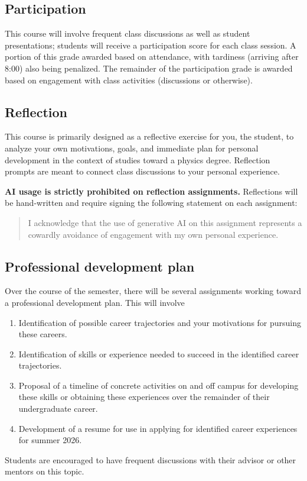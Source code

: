\documentclass{syllabus}
\begin{document}
\subsection*{Participation} This course will involve frequent class discussions as well as student presentations; students will receive a participation score for each class session. A portion of this grade awarded based on attendance, with tardiness (arriving after 8:00) also being penalized. The remainder of the participation grade is awarded based on engagement with class activities (discussions or otherwise).

\subsection{Reflection}
This course is primarily designed as a reflective exercise for you, the student, to analyze your own motivations, goals, and immediate plan for personal development in the context of studies toward a physics degree. Reflection prompts are meant to connect class discussions to your personal experience. 

\textbf{AI usage is strictly prohibited on reflection assignments.} Reflections will be hand-written and require signing the following statement on each assignment:
\begin{quote}
    I acknowledge that the use of generative AI on this assignment represents a cowardly avoidance of engagement with my own personal experience.
\end{quote}

\subsection{Professional development plan} Over the course of the semester, there will be several assignments working toward a professional development plan. This will involve 
\begin{enumerate}
    \item Identification of possible career trajectories and your motivations for pursuing these careers.
    \item Identification of skills or experience needed to succeed in the identified career trajectories.
    \item Proposal of a timeline of concrete activities on and off campus for developing these skills or obtaining these experiences over the remainder of their undergraduate career.
    \item Development of a resume for use in applying for identified career experiences for summer 2026.
\end{enumerate}
Students are encouraged to have frequent discussions with their advisor or other mentors on this topic.
\end{document}
